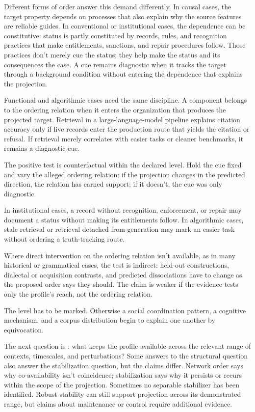 \documentclass[12pt]{article}
\begin{document}
Different forms of order answer this demand differently. In causal cases, the
target property depends on processes that also explain why the source features
are reliable guides. In conventional or institutional cases, the dependence can
be constitutive:  status is partly constituted
by records, rules, and recognition practices that make entitlements, sanctions,
and repair procedures follow. Those practices don't merely cue the status; they
help make the status and its consequences the case. A cue remains diagnostic
when it tracks the target through a background condition without entering the
dependence that explains the projection.

Functional and algorithmic cases need the same discipline. A component belongs
to the ordering relation when it enters the organization that produces the
projected target. Retrieval in a large\mbox{-}language\mbox{-}model pipeline explains citation
accuracy only if live records enter the production route that yields the citation
or refusal. If retrieval merely correlates with easier tasks or cleaner
benchmarks, it remains a diagnostic cue.

The positive test is counterfactual within the declared level. Hold the cue
fixed and vary the alleged ordering relation: if the projection changes in the
predicted direction, the relation has earned support; if it doesn't, the cue was
only diagnostic.

In institutional cases, a record without recognition,
enforcement, or repair may document a status without making its entitlements
follow. In algorithmic cases, stale retrieval or retrieval detached from
generation may mark an easier task without ordering a truth-tracking route.

Where direct intervention on the ordering relation isn't available, as in many
historical or grammatical cases, the test is indirect: held-out constructions,
dialectal or acquisition contrasts, and predicted dissociations have to change as
the proposed order says they should. The claim is weaker if the evidence tests
only the profile's reach, not the ordering relation.

The level has to be marked. Otherwise a social coordination pattern, a cognitive
mechanism, and a corpus distribution begin to explain one another by
equivocation.

The next question is : what keeps the profile available
across the relevant range of contexts, timescales, and perturbations? Some
answers to the structural question also answer the stabilization question, but
the claims differ. Network order says why co-availability isn't coincidence;
stabilization says why it persists or recurs within the scope of the projection.
Sometimes no separable
stabilizer has been identified. Robust stability can still support projection
across its demonstrated range, but claims about maintenance or control require
additional evidence.
\end{document}
